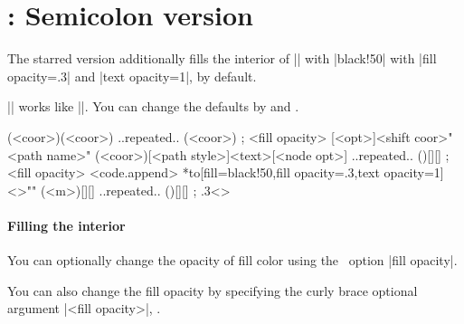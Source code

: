 \section{\protect\cmd{\tzpath*}: Semicolon version}
\label{s:tzpath*}

The starred version \icmd{\tzpath*} additionally fills the interior of |\tzpath| with |black!50| with |fill opacity=.3| and |text opacity=1|, by default.

|\tzpath*| works like |\tzpath[fill=black!50,fill opacity=.3,text opacity=1]|.
You can change the defaults by \icmd{\settzfillcolor} and \icmd{\settzfillopacity}.

\begin{tzdef}{}
\tzpath*(<coor>)(<coor>) ..repeated.. (<coor>) ; {<fill opacity>}
[<opt>]<shift coor>"<path name>"
        (<coor>)[<path style>]{<text>}[<node opt>] 
        ..repeated.. ()[]{}[] ; {<fill opacity>} <code.append>
 *{to}[fill=black!50,fill opacity=.3,text opacity=1]<>""
  (<m>)[]{}[] ..repeated.. ()[]{}[] ; {.3}<>
\end{tzdef}


\paragraph{Filling the interior}

You can optionally change the opacity of fill color using the \Tikz\ option |fill opacity|.

\begin{tzcode}{.3}
\end{tzcode}

You can also change the fill opacity by specifying the  curly brace optional argument |{<fill opacity>}|, .

\begin{tzcode}{.3}
{}
\end{tzcode}

